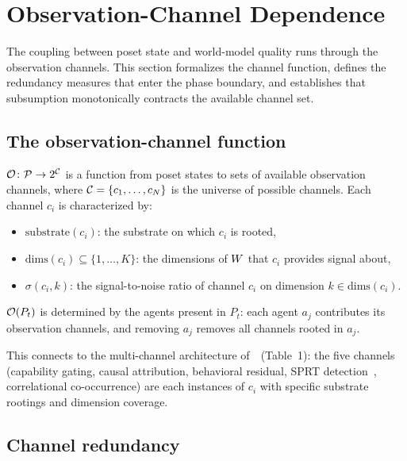 \section{Observation-Channel Dependence}
\label{sec:observation_channels}

The coupling between poset state and world-model quality runs through
the observation channels.  This section formalizes the channel function,
defines the redundancy measures that enter the phase boundary, and
establishes that subsumption monotonically contracts the available
channel set.

\subsection{The observation-channel function}

\begin{definition}
\label{def:obs_channel}
$\mathcal{O}\colon \mathcal{P} \to 2^{\mathcal{C}}$ is a function from poset states to
sets of available observation channels, where $\mathcal{C} = \{c_1, \ldots,
c_N\}$ is the universe of possible channels.  Each channel $c_i$ is
characterized by:
\begin{itemize}
\item $\mathrm{substrate}(c_i)$: the substrate on which $c_i$ is
  rooted,
\item $\mathrm{dims}(c_i) \subseteq \{1, \ldots, K\}$: the dimensions
  of $W$ that $c_i$ provides signal about,
\item $\sigma(c_i, k)$: the signal-to-noise ratio of channel $c_i$ on
  dimension $k \in \mathrm{dims}(c_i)$.
\end{itemize}
$\mathcal{O}(P_t)$ is determined by the agents present in $P_t$: each agent
$a_j$ contributes its observation channels, and removing $a_j$ removes
all channels rooted in $a_j$.
\end{definition}

This connects to the multi-channel architecture
of~\citet{lasser2026scm}~(Table~1): the five channels (capability
gating, causal attribution, behavioral residual, SPRT
detection~\citep{wald1947sequential}, correlational co-occurrence)
are each instances of $c_i$ with specific
substrate rootings and dimension coverage.

\subsection{Channel redundancy}

